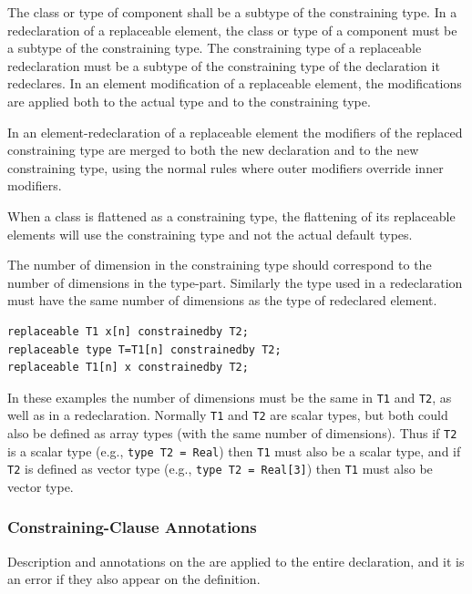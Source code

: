The class or type of component shall be a subtype of the constraining type.
In a redeclaration of a replaceable element, the class or type of a component must be a subtype of the constraining type.
The constraining type of a replaceable redeclaration must be a subtype of the constraining type of the declaration it redeclares.
In an element modification of a replaceable element, the modifications are applied both to the actual type and to the constraining type.

In an element-redeclaration of a replaceable element the modifiers of the replaced constraining type are merged to both the new declaration and to the new constraining type, using the normal rules where outer modifiers override inner modifiers.

When a class is flattened as a constraining type, the flattening of its replaceable elements will use the constraining type and not the actual default types.

The number of dimension in the constraining type should correspond to the number of dimensions in the type-part.
Similarly the type used in a redeclaration must have the same number of dimensions as the type of redeclared element.

\begin{example}
\begin{lstlisting}[language=modelica]
replaceable T1 x[n] constrainedby T2;
replaceable type T=T1[n] constrainedby T2;
replaceable T1[n] x constrainedby T2;
\end{lstlisting}
In these examples the number of dimensions must be the same in \lstinline!T1! and \lstinline!T2!, as well as in a redeclaration.
Normally \lstinline!T1! and \lstinline!T2! are scalar types, but both could also be defined as array types (with the same number of dimensions).
Thus if \lstinline!T2! is a scalar type (e.g., \lstinline!type T2 = Real!) then \lstinline!T1! must also be a scalar type, and if \lstinline!T2! is defined as vector type (e.g., \lstinline!type T2 = Real[3]!) then \lstinline!T1! must also be vector type.
\end{example}

\subsubsection{Constraining-Clause Annotations}\label{constraining-clause-annotations}

Description and annotations on the  are applied to the entire declaration, and it is an error if they also appear on the definition.

